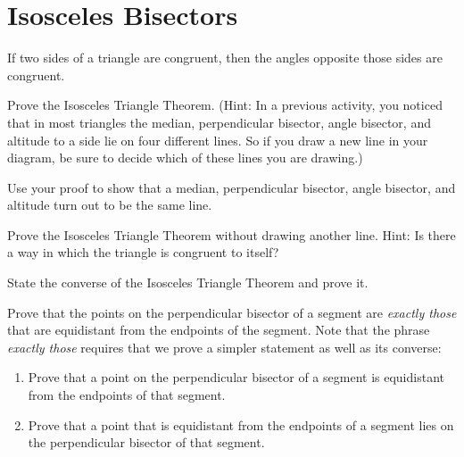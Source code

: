 \newpage

\section{Isosceles Bisectors}

\begin{theorem}
If two sides of a triangle are congruent, then the angles opposite those sides are congruent. 
\end{theorem}

\begin{prob}
Prove the Isosceles Triangle Theorem.  (Hint: In a previous activity, you noticed that in most triangles the median, perpendicular bisector, angle bisector, and altitude to a side lie on four different lines.  So if you draw a new line in your diagram, be sure to decide which of these lines you are drawing.)
\end{prob}
\vfill

\begin{prob}
Use your proof to show that a median, perpendicular bisector, angle bisector, and altitude turn out to be the same line.
\end{prob}
\vfill
\newpage

\begin{prob}
Prove the Isosceles Triangle Theorem without drawing another line.  Hint:  Is there a way in which the triangle is congruent to itself? 
\end{prob}
\vfill

\begin{prob}
State the converse of the Isosceles Triangle Theorem and prove it.  
\end{prob}
\vfill
\newpage
\begin{prob}
Prove that the points on the perpendicular bisector of a segment are \emph{exactly those} that are equidistant from the endpoints of the segment.  Note that the phrase \emph{exactly those} requires that we prove a simpler statement as well as its converse:   
\begin{enumerate}
\item Prove that a point on the perpendicular bisector of a segment is equidistant from the endpoints of that segment.
\item Prove that a point that is equidistant from the endpoints of a segment lies on the perpendicular bisector of that segment.
\end{enumerate}
\end{prob}


